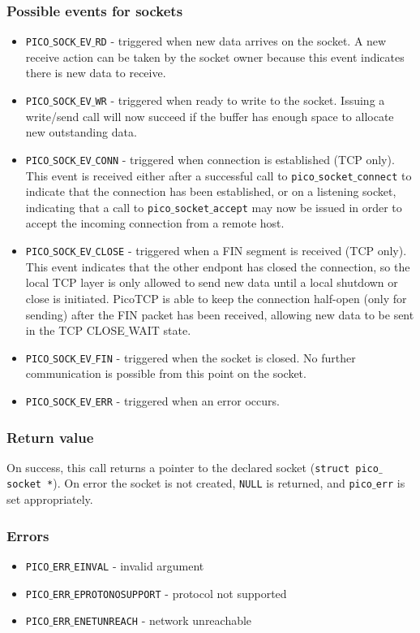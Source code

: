\subsubsection*{Possible events for sockets}
\begin{itemize}[noitemsep]
\item \texttt{PICO$\_$SOCK$\_$EV$\_$RD} - triggered when new data arrives on the socket. A new receive action can be taken by the socket owner because this event indicates there is new data to receive.
\item \texttt{PICO$\_$SOCK$\_$EV$\_$WR} - triggered when ready to write to the socket. Issuing a write/send call will now succeed if the buffer has enough space to allocate new outstanding data.
\item \texttt{PICO$\_$SOCK$\_$EV$\_$CONN} - triggered when connection is established (TCP only). This event is received either after a successful call to \texttt{pico$\_$socket$\_$connect} to indicate that the connection has been established, or on a listening socket, indicating that a call to \texttt{pico$\_$socket$\_$accept} may now be issued in order to accept the incoming connection from a remote host.
\item \texttt{PICO$\_$SOCK$\_$EV$\_$CLOSE} - triggered when a FIN segment is received (TCP only). This event indicates that the other endpont has closed the connection, so the local TCP layer is only allowed to send new data until a local shutdown or close is initiated. PicoTCP is able to keep the connection half-open (only for sending) after the FIN packet has been received, allowing new data to be sent in the TCP CLOSE$\_$WAIT state.
\item \texttt{PICO$\_$SOCK$\_$EV$\_$FIN} - triggered when the socket is closed. No further communication is possible from this point on the socket.
\item \texttt{PICO$\_$SOCK$\_$EV$\_$ERR} - triggered when an error occurs. 
\end{itemize}

\subsubsection*{Return value}
On success, this call returns a pointer to the declared socket (\texttt{struct pico$\_$socket *}).
On error the socket is not created, \texttt{NULL} is returned, and \texttt{pico$\_$err} is set appropriately.

\subsubsection*{Errors}
\begin{itemize}[noitemsep]
\item \texttt{PICO$\_$ERR$\_$EINVAL} - invalid argument
\item \texttt{PICO$\_$ERR$\_$EPROTONOSUPPORT} - protocol not supported
\item \texttt{PICO$\_$ERR$\_$ENETUNREACH} - network unreachable 
\end{itemize}


